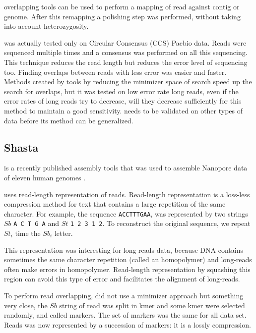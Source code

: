 \documentclass[main]{subfiles}
\begin{document}
\shimmer overlapping tools can be used to perform a mapping of read against contig or genome. After this remapping a polishing step was performed, without taking into account heterozygosity.

\peregrine was actually tested only on Circular Consensus (CCS) Pacbio data. Reads were sequenced multiple times and a consensus was performed on all this sequencing. This technique reduces the read length but reduces the error level of sequencing too. Finding overlaps between reads with less error was easier and faster. Methods created by \peregrine tools by reducing the minimizer space of search speed up the search for overlaps, but it was tested on low error rate long reads, even if the error rates of long reads try to decrease, will they decrease sufficiently for this method to maintain a good sensitivity. \peregrine needs to be validated on other types of data before its method can be generalized.

\subsection{Shasta}

\newcommand{\shasta}{}

\shasta is a recently published assembly tools that was used to assemble Nanopore data of eleven human genomes \cite{Shasta}.

\shasta uses read-length representation of reads. Read-length representation is a loss-less compression method for text that contains a large repetition of the same character. For example, the sequence \texttt{ACCTTTGAA}, was represented by two strings $Sb$ \texttt{A C T G A} and $St$ \texttt{1 2 3 1 2}. To reconstruct the original sequence, we repeat $St_i$ time the $Sb_i$ letter.

This representation was interesting for long-reads data, because DNA contains sometimes the same character repetition (called an homopolymer) and long-reads often make errors in homopolymer. Read-length representation by squashing this region can avoid this type of error and facilitates the alignment of long-reads.

To perform read overlapping, \shasta did not use a minimizer approach but something very close, the $Sb$ string of read was split in kmer and some kmer were selected randomly, and called markers. The set of markers was the same for all data set. Reads was now represented by a succession of markers: it is a lossly compression.
\end{document}
